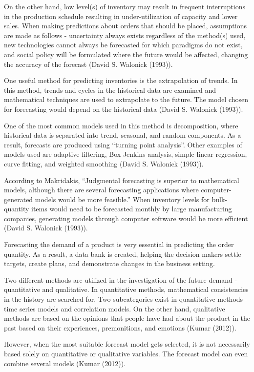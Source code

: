 \documentclass[]{elsarticle} %
\begin{document}
On the other hand, low level(s) of inventory may result in frequent
interruptions in the production schedule resulting in under-utilization
of capacity and lower sales. When making predictions about orders that
should be placed, assumptions are made as follows - uncertainty always
exists regardless of the method(s) used, new technologies cannot always
be forecasted for which paradigms do not exist, and social policy will
be formulated where the future would be affected, changing the accuracy
of the forecast (David S. Walonick (1993)).

One useful method for predicting inventories is the extrapolation of
trends. In this method, trends and cycles in the historical data are
examined and mathematical techniques are used to extrapolate to the
future. The model chosen for forecasting would depend on the historical
data (David S. Walonick (1993)).

One of the most common models used in this method is decomposition,
where historical data is separated into trend, seasonal, and random
components. As a result, forecasts are produced using ``turning point
analysis''. Other examples of models used are adaptive filtering,
Box-Jenkins analysis, simple linear regression, curve fitting, and
weighted smoothing (David S. Walonick (1993)).

According to Makridakis, ``Judgmental forecasting is superior to
mathematical models, although there are several forecasting applications
where computer-generated models would be more feasible.'' When inventory
levels for bulk-quantity items would need to be forecasted monthly by
large manufacturing companies, generating models through computer
software would be more efficient (David S. Walonick (1993)).

Forecasting the demand of a product is very essential in predicting the
order quantity. As a result, a data bank is created, helping the
decision makers settle targets, create plans, and demonstrate changes in
the business setting.

Two different methods are utilized in the investigation of the future
demand - quantitative and qualitative. In quantitative methods,
mathematical consistencies in the history are searched for. Two
subcategories exist in quantitative methods - time series models and
correlation models. On the other hand, qualitative methods are based on
the opinions that people have had about the product in the past based on
their experiences, premonitions, and emotions (Kumar (2012)).

However, when the most suitable forecast model gets selected, it is not
necessarily based solely on quantitative or qualitative variables. The
forecast model can even combine several models (Kumar (2012)).
\end{document}
